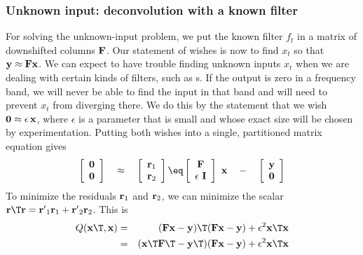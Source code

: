 \subsubsection{Unknown input: deconvolution with a known filter}
For solving the unknown-input problem,
we put the known filter $f_t$ in a matrix of downshifted columns $\bold F$.
Our statement of wishes is now to find $x_t$ so that
$\bold y \approx \bold F \bold x$.
We can expect to have trouble finding unknown inputs $x_t$
when we are dealing with certain kinds of filters,
such as s.
If the output is zero in a frequency band,
we will never be able to find the input in that band
and will need to prevent $x_t$ from diverging there.
We do this by the statement that we wish
$\bold 0\approx\epsilon\,\bold x$,
where $\epsilon$ is a parameter that is small
and whose exact size will be chosen by experimentation.
Putting both wishes into a single, partitioned matrix equation gives
\begin{equation}
 \left[ 
  \begin{array}{c}
   \bold 0 \\ 
   \bold 0
  \end{array}
 \right] 
\quad\approx\quad
 \left[ 
  \begin{array}{c}
   \bold r_1 \\ 
   \bold r_2
  \end{array}
 \right] 
\eq
 \left[ 
  \begin{array}{c}
   \bold F \\ 
   \epsilon \  \bold I
  \end{array}
 \right] 
 \ 
 \bold x
\quad - \quad
 \left[ 
  \begin{array}{c}
   \bold y \\ 
   \bold 0
  \end{array}
 \right] 
\end{equation}
To minimize the residuals $\bold r_1$ and $\bold r_2$,
we can minimize the scalar
$\bold r\T \bold r = \bold {r'}_1\bold r_1 + \bold {r'}_2\bold r_2$.
This is
\begin{eqnarray}
Q(\bold x\T, \bold x) &=& (\bold F  \bold x  - \bold y)\T (\bold F\bold x-\bold y)
                                        + \epsilon^2 \bold x\T \bold x
                                                                \nonumber \\
                     &=& (\bold x\T \bold F\T - \bold y\T) (\bold F\bold x-\bold y)
                                        + \epsilon^2 \bold x\T \bold x
\label{eqn:knownfilt}
\end{eqnarray}
